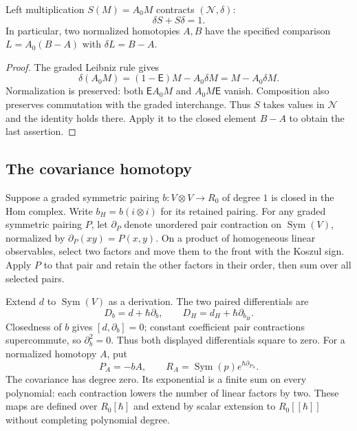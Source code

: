 \begin{lemma}\label{lem:vol2-gaussian-choice-contraction}
Left multiplication $S(M)=A_0M$ contracts
$(\mathcal N,\delta)$:
\[
 \delta S+S\delta=1.
\]
In particular, two normalized homotopies $A,B$ have the
specified comparison $L=A_0(B-A)$ with $\delta L=B-A$.
\end{lemma}
\begin{proof}
The graded Leibniz rule gives
\[
 \delta(A_0M)=(1-\mathsf E)M-A_0\delta M
                                      =M-A_0\delta M.
\]
Normalization is preserved: both
$\mathsf EA_0M$ and $A_0M\mathsf E$ vanish.
Composition also preserves commutation with the graded
interchange. Thus $S$ takes values in $\mathcal N$ and
the identity holds there. Apply it to the closed element
$B-A$ to obtain the last assertion.
\end{proof}

\subsection{The covariance homotopy}

Suppose a graded symmetric pairing
$b:V\otimes V\to R_0$ of degree $1$ is closed in the
Hom complex. Write $b_H=b(i\otimes i)$ for its retained
pairing. For any graded symmetric pairing $P$, let
$\partial_P$ denote unordered pair contraction on
$\operatorname{Sym}(V)$, normalized by
$\partial_P(xy)=P(x,y)$. On a product of homogeneous
linear observables, select two factors and move them
to the front with the Koszul sign. Apply $P$ to that pair
and retain the other factors in their order, then sum
over all selected pairs.

Extend $d$ to $\operatorname{Sym}(V)$ as a derivation.
The two paired differentials are
\[
 D_b=d+\hbar\partial_b,
 \qquad D_H=d_H+\hbar\partial_{b_H}.
\]
Closedness of $b$ gives $[d,\partial_b]=0$; constant
coefficient pair contractions supercommute, so
$\partial_b^2=0$. Thus both displayed differentials
square to zero. For a normalized homotopy $A$, put
\begin{equation}\label{eq:vol2-choice-gaussian-map}
 P_A=-bA,
 \qquad R_A=\operatorname{Sym}(p)e^{\hbar\partial_{P_A}}.
\end{equation}
The covariance has degree zero. Its exponential is a
finite sum on every polynomial: each contraction lowers
the number of linear factors by two. These maps are
defined over $R_0[\hbar]$ and extend by scalar extension to
$R_0[[\hbar]]$ without completing polynomial degree.

